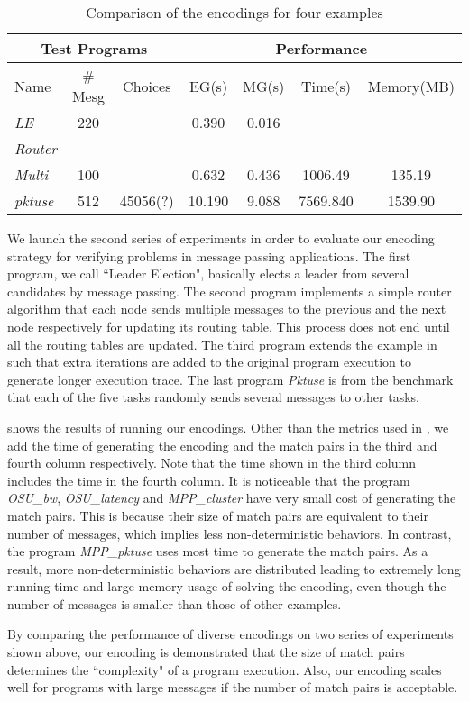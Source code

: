 \begin{table}
\begin{center}
\scriptsize
\begin{tabular}{|l|c|c||c|c|c|c|}
		\hline
         \multicolumn{3}{|c||}{Test Programs} & \multicolumn{4}{|c|}{Performance} \\ \hline
         Name & \# Mesg & Choices & EG(s) & MG(s) & Time(s) & Memory(MB) \\ \hline
         \textit{LE} & 220 &  & 0.390 & 0.016 &  &  \\
         \textit{Router} &  &  &  &  &  &  \\
         \textit{Multi} & 100 &  & 0.632 & 0.436 &  1006.49 & 135.19  \\
         \textit{pktuse} & 512 & 45056(?) & 10.190 & 9.088 & 7569.840 & 1539.90 \\
         \hline
		\end{tabular}
\end{center}
\caption{Comparison of the encodings for four examples}
\label{table:second}
\end{table}
We launch the second series of experiments in order to evaluate our encoding strategy for verifying problems in message passing applications. The first program, we call ``Leader Election", basically elects a leader from several candidates by message passing. The second program implements a simple router algorithm that each node sends multiple messages to the previous and the next node respectively for updating its routing table. This process does not end until all the routing tables are updated. The third program extends the example in  such that extra iterations are added to the original program execution to generate longer execution trace. The last program \textit{Pktuse} is from the benchmark \cite{mpptest_benchmark} that each of the five tasks randomly sends several messages to other tasks.

 shows the results of running our encodings. Other than the metrics used in , we add the time of generating the encoding and the match pairs in the third and fourth column respectively. Note that the time shown in the third column includes the time in the fourth column. It is noticeable that the program \textit{OSU\_bw}, \textit{OSU\_latency} and \textit{MPP\_cluster} have very small cost of generating the match pairs. This is because their size of match pairs are equivalent to their number of messages, which implies less non-deterministic behaviors. In contrast, the program \textit{MPP\_pktuse} uses most time to generate the match pairs. As a result, more non-deterministic behaviors are distributed leading to extremely long running time and large memory usage of solving the encoding, even though the number of messages is smaller than those of other examples.

By comparing the performance of diverse encodings on two series of experiments shown above, our encoding is demonstrated that the size of match pairs determines the ``complexity" of a program execution. Also, our encoding scales well for programs with large messages if the number of match pairs is acceptable.

